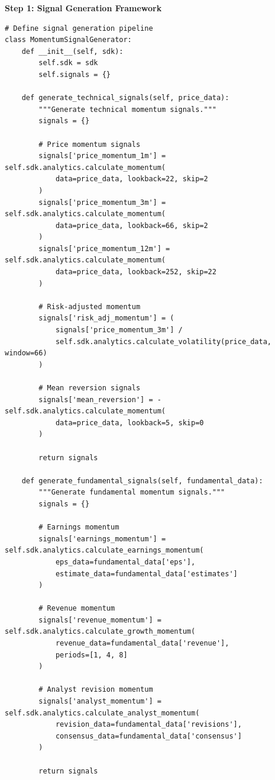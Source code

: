 \documentclass[12pt,a4paper]{article}
\theoremstyle{definition}
\theoremstyle{remark}
\begin{document}
\textbf{Step 1: Signal Generation Framework}
\begin{lstlisting}[caption=Multi-Factor Signal Generation]
# Define signal generation pipeline
class MomentumSignalGenerator:
    def __init__(self, sdk):
        self.sdk = sdk
        self.signals = {}
        
    def generate_technical_signals(self, price_data):
        """Generate technical momentum signals."""
        signals = {}
        
        # Price momentum signals
        signals['price_momentum_1m'] = self.sdk.analytics.calculate_momentum(
            data=price_data, lookback=22, skip=2
        )
        signals['price_momentum_3m'] = self.sdk.analytics.calculate_momentum(
            data=price_data, lookback=66, skip=2
        )
        signals['price_momentum_12m'] = self.sdk.analytics.calculate_momentum(
            data=price_data, lookback=252, skip=22
        )
        
        # Risk-adjusted momentum
        signals['risk_adj_momentum'] = (
            signals['price_momentum_3m'] / 
            self.sdk.analytics.calculate_volatility(price_data, window=66)
        )
        
        # Mean reversion signals
        signals['mean_reversion'] = -self.sdk.analytics.calculate_momentum(
            data=price_data, lookback=5, skip=0
        )
        
        return signals
    
    def generate_fundamental_signals(self, fundamental_data):
        """Generate fundamental momentum signals."""
        signals = {}
        
        # Earnings momentum
        signals['earnings_momentum'] = self.sdk.analytics.calculate_earnings_momentum(
            eps_data=fundamental_data['eps'],
            estimate_data=fundamental_data['estimates']
        )
        
        # Revenue momentum
        signals['revenue_momentum'] = self.sdk.analytics.calculate_growth_momentum(
            revenue_data=fundamental_data['revenue'],
            periods=[1, 4, 8]
        )
        
        # Analyst revision momentum
        signals['analyst_momentum'] = self.sdk.analytics.calculate_analyst_momentum(
            revision_data=fundamental_data['revisions'],
            consensus_data=fundamental_data['consensus']
        )
        
        return signals
    

\end{lstlisting}
\end{document}
